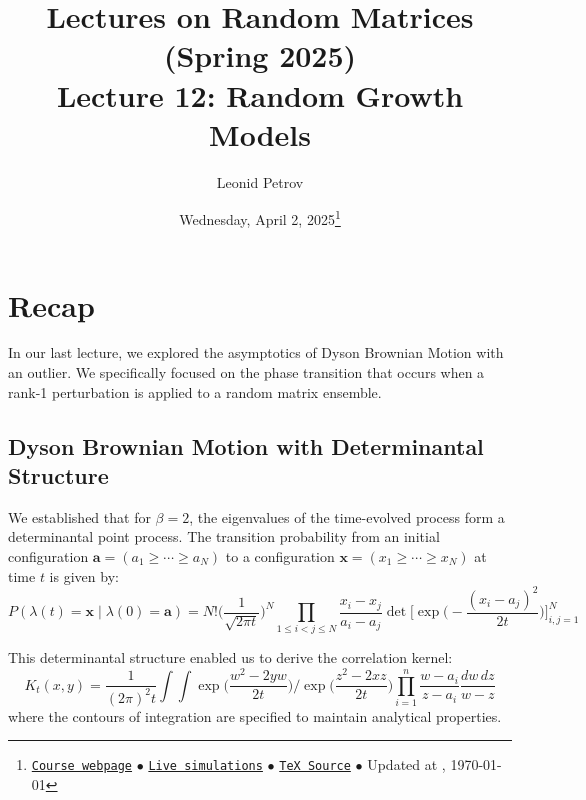 \documentclass[letterpaper,11pt,oneside,reqno]{article}
\numberwithin{equation}{section}
\theoremstyle{definition}
\begin{document}
\title{Lectures on Random Matrices
(Spring 2025)
\\Lecture 12: Random Growth Models}


\date{Wednesday, April 2, 2025\footnote{\href{https://lpetrov.cc/rmt25/}{\texttt{Course webpage}}
$\bullet$ \href{https://lpetrov.cc/simulations/model/random-matrices/}{\texttt{Live simulations}}
$\bullet$ \href{https://lpetrov.cc/rmt25/rmt25-notes/rmt2025-l12.tex}{\texttt{TeX Source}}
$\bullet$
Updated at \currenttime, \today}}



\author{Leonid Petrov}


\maketitle
\tableofcontents


\section{Recap}

In our last lecture, we explored the asymptotics of Dyson Brownian Motion with an outlier. We specifically focused on the phase transition that occurs when a rank-1 perturbation is applied to a random matrix ensemble.

\subsection{Dyson Brownian Motion with Determinantal Structure}

We established that for $\beta=2$, the eigenvalues of the time-evolved process form a determinantal point process. The transition probability from an initial configuration $\mathbf{a} = (a_1 \geq \cdots \geq a_N)$ to a configuration $\mathbf{x} = (x_1 \geq \cdots \geq x_N)$ at time $t$ is given by:
\begin{equation*}
P(\lambda(t) = \mathbf{x} \mid \lambda(0) = \mathbf{a}) = N! \Big(\frac{1}{\sqrt{2\pi t}}\Big)^N \prod_{1\leq i<j\leq N}\frac{x_i - x_j}{a_i - a_j} \det\Big[\exp\Big(-\frac{(x_i - a_j)^2}{2t}\Big)\Big]_{i,j=1}^N
\end{equation*}

This determinantal structure enabled us to derive the correlation kernel:
\begin{equation}\label{eq:correlation-kernel}
K_t(x,y) = \frac{1}{(2\pi)^2 t} \int\int \exp\Big(\frac{w^2 - 2yw}{2t}\Big) \bigg/ \exp\Big(\frac{z^2 - 2xz}{2t}\Big) \prod_{i=1}^n \frac{w-a_i}{z-a_i} \frac{dw\,dz}{w-z}
\end{equation}
where the contours of integration are specified to maintain analytical properties.
\end{document}
